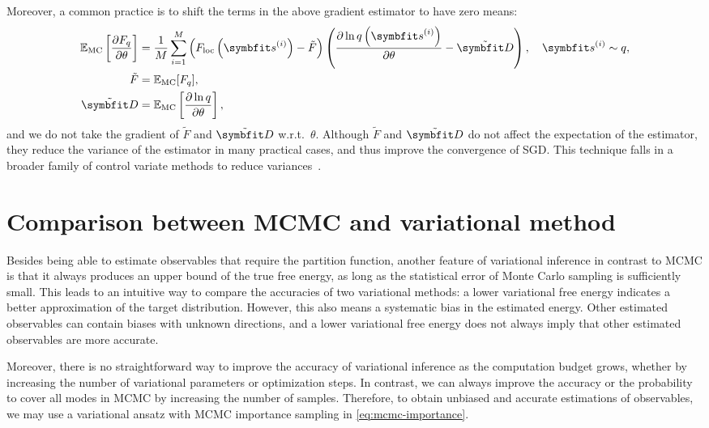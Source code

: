 Moreover, a common practice is to shift the terms in the above gradient estimator to have zero means:
\begin{align}
\bbE_\text{MC}\left[ \frac{\partial F_q}{\partial \theta} \right]
&= \frac{1}{M} \sum_{i = 1}^M \left( F_\text{loc}\left( \vs^{(i)} \right) - \tilde{F} \right) \left( \frac{\partial \ln q\left( \vs^{(i)} \right)}{\partial \theta} - \tilde{\vD} \right), \quad
\vs^{(i)} \sim q, \label{eq:fq-grad-baseline} \\
\tilde{F} &= \bbE_\text{MC}[F_q], \\
\tilde{\vD} &= \bbE_\text{MC}\left[ \frac{\partial \ln q}{\partial \theta} \right],
\end{align}
and we do not take the gradient of $\tilde{F}$ and $\tilde{\vD}$ w.r.t.\ $\theta$. Although $\tilde{F}$ and $\tilde{\vD}$ do not affect the expectation of the estimator, they reduce the variance of the estimator in many practical cases, and thus improve the convergence of SGD. This technique falls in a broader family of control variate methods to reduce variances~\cite{ranganath2014black, wan2019neural}.

\section{Comparison between MCMC and variational method}
\label{sec:compare-mcmc}

Besides being able to estimate observables that require the partition function, another feature of variational inference in contrast to MCMC is that it always produces an upper bound of the true free energy, as long as the statistical error of Monte Carlo sampling is sufficiently small. This leads to an intuitive way to compare the accuracies of two variational methods: a lower variational free energy indicates a better approximation of the target distribution. However, this also means a systematic bias in the estimated energy. Other estimated observables can contain biases with unknown directions, and a lower variational free energy does not always imply that other estimated observables are more accurate.

Moreover, there is no straightforward way to improve the accuracy of variational inference as the computation budget grows, whether by increasing the number of variational parameters or optimization steps. In contrast, we can always improve the accuracy or the probability to cover all modes in MCMC by increasing the number of samples. Therefore, to obtain unbiased and accurate estimations of observables, we may use a variational ansatz with MCMC importance sampling in \cref{eq:mcmc-importance}.


